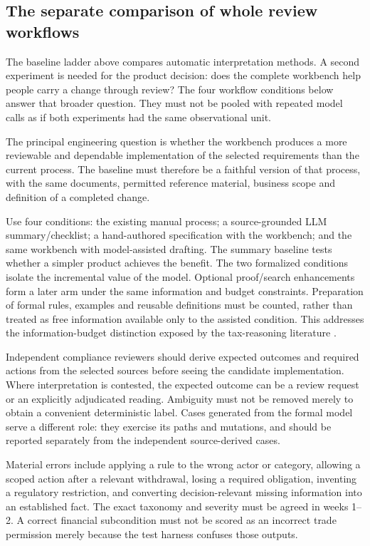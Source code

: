 \documentclass[12pt,a4paper,oneside,openany]{book}
\begin{document}
\subsection{The separate comparison of whole review workflows}

The baseline ladder above compares automatic interpretation methods. A second
experiment is needed for the product decision: does the complete workbench help
people carry a change through review? The four workflow conditions below answer
that broader question. They must not be pooled with repeated model calls as if
both experiments had the same observational unit.


\label{merge:P-04-prototype:04}


The principal engineering question is whether the workbench produces a more
reviewable and dependable implementation of the selected requirements than the
current process. The baseline must therefore be a faithful version of that
process, with the same documents, permitted reference material, business scope and
definition of a completed change.

Use four conditions: the existing manual process; a source-grounded LLM
summary/checklist; a hand-authored specification with the workbench; and the same
workbench with model-assisted drafting. The summary baseline tests whether a
simpler product achieves the benefit. The two formalized conditions isolate the
incremental value of the model. Optional proof/search enhancements form a later
arm under the same information and budget constraints. Preparation of formal
rules, examples and reusable definitions must be counted, rather than treated as
free information available only to the assisted condition. This addresses the
information-budget distinction exposed by the tax-reasoning literature
\citep{jurayj2026}.

Independent compliance reviewers should derive expected outcomes and required
actions from the selected sources before seeing the candidate implementation.
Where interpretation is contested, the expected outcome can be a review request
or an explicitly adjudicated reading. Ambiguity must not be removed merely to
obtain a convenient deterministic label. Cases generated from the formal model
serve a different role: they exercise its paths and mutations, and should be
reported separately from the independent source-derived cases.

Material errors include applying a rule to the wrong actor or category, allowing
a scoped action after a relevant withdrawal, losing a required obligation,
inventing a regulatory restriction, and converting decision-relevant missing
information into an established fact. The exact taxonomy and severity must be
agreed in weeks 1--2. A correct financial subcondition must not be scored as an
incorrect trade permission merely because the test harness confuses those outputs.
\end{document}
